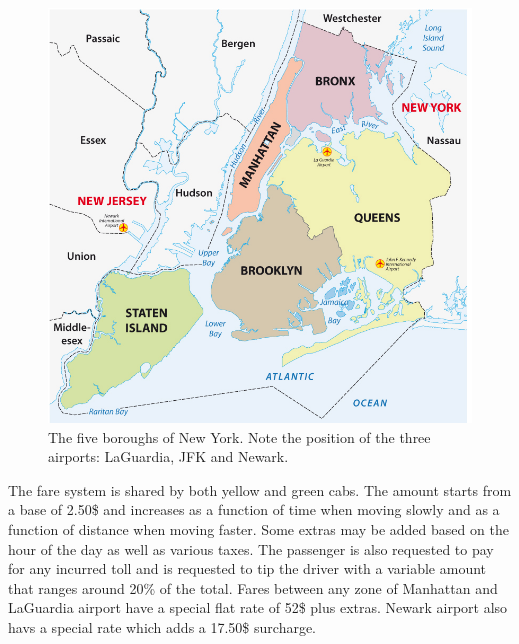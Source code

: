 \documentclass{acm_proc_article-sp-sigmod09}
\begin{document}
\begin{figure}
	\centering
	\includegraphics{resources/boroughsMap.jpg}
	\caption{The five boroughs of New York. Note the position of the three airports: LaGuardia, JFK and Newark.}
	\label{fig:boroughsMap}
\end{figure}

The fare system is shared by both yellow and green cabs. The amount starts from a base of 2.50\$ and increases as a function of time when moving slowly and as a function of distance when moving faster. Some extras may be added based on the hour of the day as well as various taxes. The passenger is also requested to pay for any incurred toll and is requested to tip the driver with a variable amount that ranges around 20\% of the total. Fares between any zone of Manhattan and LaGuardia airport have a special flat rate of 52\$ plus extras. Newark airport also havs a special rate which adds a 17.50\$ surcharge.
\end{document}

